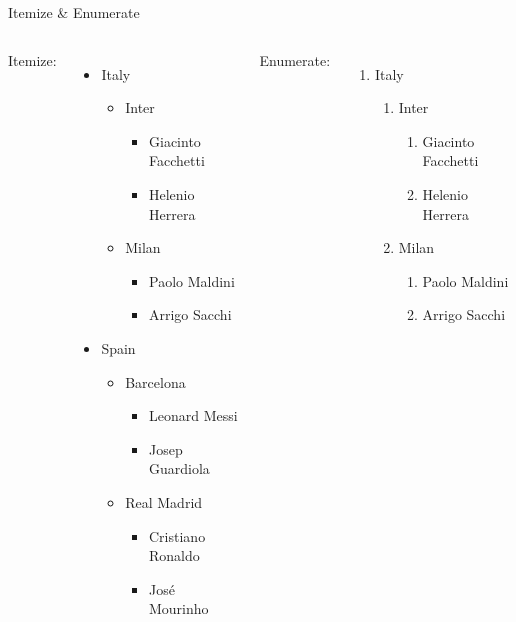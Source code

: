 \begin{frame}{Itemize \& Enumerate}
\begin{columns}
Itemize:

\begin{itemize}
\item Italy
      \begin{itemize}
      \item Inter
            \begin{itemize}
            \item Giacinto Facchetti
            \item Helenio Herrera
            \end{itemize}
      \item Milan
            \begin{itemize}
            \item Paolo Maldini
            \item Arrigo Sacchi
            \end{itemize}
      \end{itemize}

\item Spain
      \begin{itemize}
      \item Barcelona
            \begin{itemize}
            \item Leonard Messi
            \item Josep Guardiola
            \end{itemize}
      \item Real Madrid
            \begin{itemize}
            \item Cristiano Ronaldo
            \item José Mourinho
            \end{itemize}
      \end{itemize}
\end{itemize}

Enumerate:

\begin{enumerate}
\item Italy
      \begin{enumerate}
      \item Inter
            \begin{enumerate}
            \item Giacinto Facchetti
            \item Helenio Herrera
            \end{enumerate}
      \item Milan
            \begin{enumerate}
            \item Paolo Maldini
            \item Arrigo Sacchi
            \end{enumerate}
      \end{enumerate}


\end{enumerate}
\end{columns}
\end{frame}
